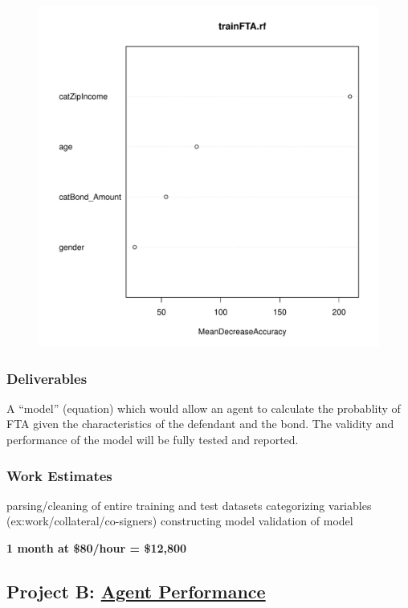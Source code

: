 \documentclass{article}
\begin{document}
\begin{figure}[H]
\centering
\includegraphics[width=0.40\paperwidth,page=3]{varPlot.pdf}
\end{figure}
 
\subsubsection{Deliverables}
A ``model'' (equation) which would allow an agent to calculate the probablity of FTA given the characteristics of the defendant and the bond.
The validity and performance of the model will be fully tested and reported. 
   

\subsubsection{Work Estimates}
 parsing/cleaning of entire training and test datasets
 categorizing variables (ex:work/collateral/co-signers)
 constructing model
 validation of model

\textbf{1 month at \$80/hour = \$12,800}

\clearpage
\subsection{Project B: \underline{Agent Performance}}
~\\
\end{document}

